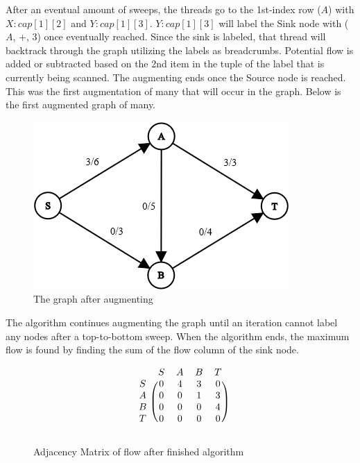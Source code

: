         After an eventual amount of sweeps, the threads go to the 1st-index row ($A$) with $X:cap[1][2]$ and $Y:cap[1][3]$. $Y:cap[1][3]$ will label the Sink node with ($A$, +, 3) once eventually reached. Since the sink is labeled, that thread will backtrack through the graph utilizing the labels as breadcrumbs. Potential flow is added or subtracted based on the 2nd item in the tuple of the label that is currently being scanned. The augmenting ends once the Source node is reached. This was the first augmentation of many that will occur in the graph. Below is the first augmented graph of many.
        
        \begin{figure}[H]
            \centering
            \includegraphics[scale=.7]{figures/FFaugmented.png}
            \caption{The graph after augmenting}
            \label{fig:Sweep}
        \end{figure}
        
        The algorithm continues augmenting the graph until an iteration cannot label any nodes after a top-to-bottom sweep. When the algorithm ends, the maximum flow is found by finding the sum of the flow column of the sink node.
        
        \begin{figure}[H]
            \centering
            \[
                \begin{blockarray}{ccccc}
                    & S & A & B & T \\
                    \begin{block}{c(cccc)}
                        S & 0 & 4 & 3 & 0 \\
                        A & 0 & 0 & 1 & 3 \\
                        B & 0 & 0 & 0 & 4 \\
                        T & 0 & 0 & 0 & 0 \\
                    \end{block}
                \end{blockarray}
            \]
            \caption{Adjacency Matrix of flow after finished algorithm}
        \end{figure}
        
